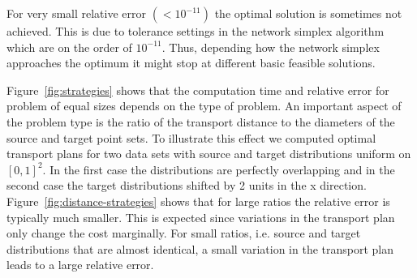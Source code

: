 \documentclass[twoside,11pt]{article}
\begin{document}
  \vspace{-0.15in}
For very small relative error $( < 10^{-11} )$ the optimal solution is
sometimes not achieved. This is due to tolerance settings in the network
simplex algorithm which are on the order of $10^{-11}$. Thus, depending how the
network simplex approaches the optimum it might stop at different basic
feasible solutions.  

Figure~\ref{fig:strategies} shows that the computation time and relative
error for problem of equal sizes depends on the type of problem. An important
aspect of the problem type is the ratio of the transport distance to the diameters
of the source and target point sets. To illustrate this effect we computed
optimal transport plans for two data sets with source and target
distributions uniform on $[0,1]^2$. In the first case the distributions are
perfectly overlapping and in the second case the target distributions shifted
by 2 units in the x direction.  Figure~\ref{fig:distance-strategies} shows that
for large ratios the relative error is typically much smaller.  This is
expected since variations in the transport plan only change the cost
marginally. For small ratios, i.e.  source and target distributions that are
almost identical, a small variation in the transport plan leads to a large
relative error.
\end{document}
